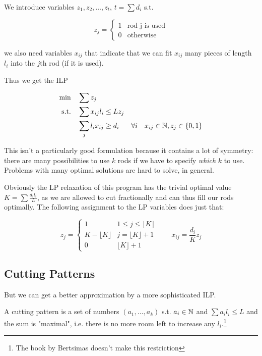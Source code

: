 We introduce variables $z_1,z_2,\ldots , z_t$, $t = \sum d_i$ s.t. 

\[z_j=\begin{cases} 1 & \text{rod j is used}\\
0 & \text{otherwise}\end{cases}\]

we also need variables $x_{ij}$ that indicate that we can fit $x_{ij}$ many pieces of length $l_i$ into the $j$th rod (if it is used).

Thus we get the ILP

\begin{align*}
\min \quad & \sum z_j\\
\text{s.t.} \quad & \sum x_{ij}l_i \leq Lz_j\\
	& \sum_{j} l_ix_{ij} \geq d_i && \forall i
	&x_{ij} \in \mathbb{N}, z_j \in \{0,1\}
\end{align*}

This isn't a particularly good formulation because it contains a lot of symmetry: there are many possibilities to use $k$ rods if we have to specify \emph{which} $k$ to use. Problems with many optimal solutions are hard to solve, in general.

Obviously the LP relaxation of this program has the trivial optimal value $K=\sum \frac{d_il_i}{L}$, as we are allowed to cut fractionally and can thus fill our rods optimally. The following assignment to the LP variables does just that:

\[z_j = \begin{cases}
1 & 1 \leq j \leq \lfloor K\rfloor \\
K-\lfloor K \rfloor & j=\lfloor K\rfloor +1\\
0 & \lfloor K \rfloor +1\end{cases}\qquad x_{ij} = \frac{d_i}{K}z_j\]

\subsection{Cutting Patterns}

But we can get a better approximation by a more sophisticated ILP.

\begin{Def} A cutting pattern is a set of numbers $(a_1,\ldots,a_k)$ s.t. $a_i\in \mathbb{N}$ and $\sum a_il_i\leq L$ and the sum is "maximal", i.e. there is no more room left to increase any $l_i$.\footnote{The book by Bertsimas doesn't make this restriction}
\end{Def}

